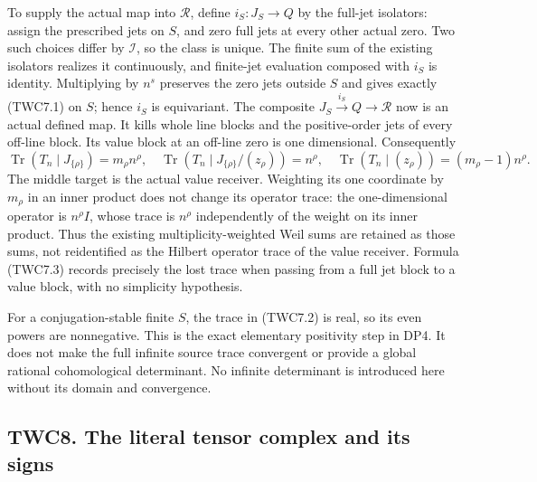 To supply the actual map into \(\mathcal R\), define \(i_S:J_S\to Q\) by
the full-jet isolators: assign the prescribed jets on \(S\), and zero
full jets at every other actual zero. Two such choices differ by
\(\mathcal I\), so the class is unique. The finite sum of the existing
isolators realizes it continuously, and finite-jet evaluation composed
with \(i_S\) is identity. Multiplying by \(n^s\) preserves the zero jets
outside \(S\) and gives exactly (TWC7.1) on \(S\); hence \(i_S\) is
equivariant. The composite \(J_S\xrightarrow{i_S}Q\to\mathcal R\) now is
an actual defined map. It kills whole line blocks and the positive-order
jets of every off-line block. Its value block at an off-line zero is one
dimensional. Consequently \[
\operatorname{Tr}(T_n\mid J_{\{\rho\}})=m_\rho n^\rho,
\quad
\operatorname{Tr}(T_n\mid J_{\{\rho\}}/(z_\rho))=n^\rho,
\quad
\operatorname{Tr}(T_n\mid (z_\rho))=(m_\rho-1)n^\rho.
\tag{TWC7.3}
\] The middle target is the actual value receiver. Weighting its one
coordinate by \(m_\rho\) in an inner product does not change its
operator trace: the one-dimensional operator is \(n^\rho I\), whose
trace is \(n^\rho\) independently of the weight on its inner product.
Thus the existing multiplicity-weighted Weil sums are retained as those
sums, not reidentified as the Hilbert operator trace of the value
receiver. Formula (TWC7.3) records precisely the lost trace when passing
from a full jet block to a value block, with no simplicity hypothesis.

For a conjugation-stable finite \(S\), the trace in (TWC7.2) is real, so
its even powers are nonnegative. This is the exact elementary positivity
step in DP4. It does not make the full infinite source trace convergent
or provide a global rational cohomological determinant. No infinite
determinant is introduced here without its domain and convergence.

\subsection{TWC8. The literal tensor complex and its
signs}\label{twc8.-the-literal-tensor-complex-and-its-signs}

